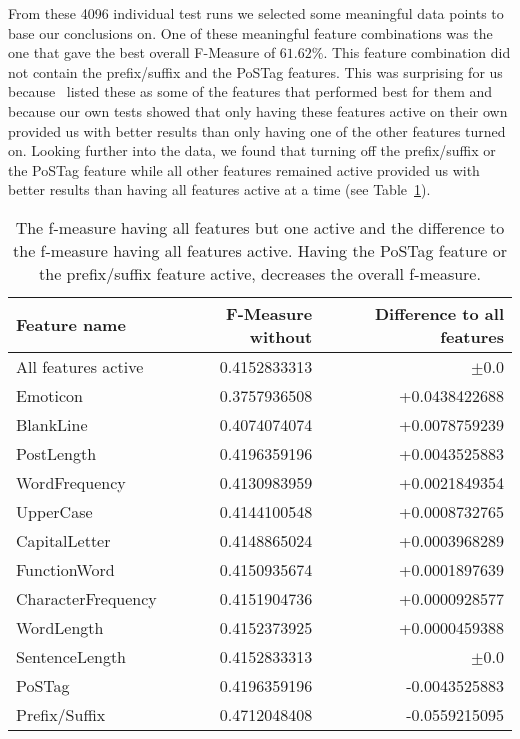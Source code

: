 From these 4096 individual test runs we selected some meaningful data points to base our conclusions on.
One of these meaningful feature combinations was the one that gave the best overall F-Measure of $61.62\%$.
This feature combination did not contain the prefix/suffix and the PoSTag features.
This was surprising for us because~\cite{madigan2005author} listed these as some of the features that performed best for them and because our own tests showed that only having these features active on their own provided us with better results than only having one of the other features turned on.
Looking further into the data, we found that turning off the prefix/suffix or the PoSTag feature while all other features remained active provided us with better results than having all features active at a time (see Table~\ref{tab:feature_evaluation_1}).

\begin{table}[h]
	\begin{center}
    \begin{tabular}{l|r|r}
	Feature name		& F-Measure without & Difference to all features \\ \hline \hline
	All features active	& 0.4152833313 & $\pm$0.0 \\ \hline \hline
	Emoticon			& 0.3757936508 & +0.0438422688 \\ \hline
	BlankLine			& 0.4074074074 & +0.0078759239 \\ \hline
	PostLength			& 0.4196359196 & +0.0043525883 \\ \hline
	WordFrequency		& 0.4130983959 & +0.0021849354 \\ \hline
	UpperCase			& 0.4144100548 & +0.0008732765 \\ \hline
	CapitalLetter		& 0.4148865024 & +0.0003968289 \\ \hline
	FunctionWord		& 0.4150935674 & +0.0001897639 \\ \hline
	CharacterFrequency	& 0.4151904736 & +0.0000928577 \\ \hline
	WordLength			& 0.4152373925 & +0.0000459388 \\ \hline
	SentenceLength		& 0.4152833313 & $\pm$0.0 	   \\ \hline
	PoSTag				& 0.4196359196 & -0.0043525883 \\ \hline
	Prefix/Suffix		& 0.4712048408 & -0.0559215095 \\ \hline
    \end{tabular}
    \end{center}
	\caption{The f-measure having all features but one active and the difference to the f-measure having all features active. Having the PoSTag feature or the prefix/suffix feature active, decreases the overall f-measure.}
	\label{tab:feature_evaluation_1}
\end{table}


